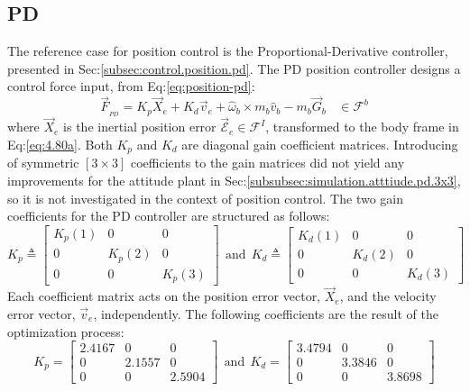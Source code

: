 \subsection{PD}
\label{subsec:simulation.position.pd}
The reference case for position control is the Proportional-Derivative controller, presented in Sec:\ref{subsec:control.position.pd}. The PD position controller designs a control force input, from Eq:\ref{eq:position-pd}:
\begin{equation}\label{eq:optimized-position}
\vec{F}_{_{PD}}=K_p\vec{X}_e + K_d\vec{v}_e + \hat{\omega}_b\times m_b\hat{v}_b-m_b\vec{G}_b~~~~\in\mathcal{F}^{b}
\end{equation}
where $\vec{X}_e$ is the inertial position error $\vec{\mathcal{E}}_e\in\mathcal{F}^{I}$, transformed to the body frame in Eq:\ref{eq:4.80a}. Both $K_p$ and $K_d$ are diagonal gain coefficient matrices. Introducing of symmetric $[3\times 3]$ coefficients to the gain matrices did not yield any improvements for the attitude plant in Sec:\ref{subsubsec:simulation.atttiude.pd.3x3}, so it is not investigated in the context of position control. The two gain coefficients for the PD controller are structured as follows:
\begin{equation}\label{eq:simulation-attitde-pd-diagonal-coefficients}
K_p\triangleq \begin{bmatrix}
K_p(1) & 0 & 0\\
0 & K_p(2) & 0\\
0 & 0 & K_p(3)
\end{bmatrix}
~~\text{and}~~K_d\triangleq \begin{bmatrix}
K_d(1) & 0 & 0\\
0 & K_d(2) & 0\\
0 & 0 & K_d(3)
\end{bmatrix}
\end{equation}
Each coefficient matrix acts on the position error vector, $\vec{X}_e$, and the velocity error vector, $\vec{v}_e$, independently. The following coefficients are the result of the optimization process:
\begin{equation}\label{eq:optimized-position-pd}
K_p = \begin{bmatrix}
2.4167 & 0 & 0\\
0 & 2.1557 & 0\\
0 & 0 & 2.5904
\end{bmatrix}
~~\text{and}~~K_d = \begin{bmatrix}
3.4794 & 0 & 0\\
0 & 3.3846 & 0\\
0 & 0 & 3.8698
\end{bmatrix}
\end{equation}
